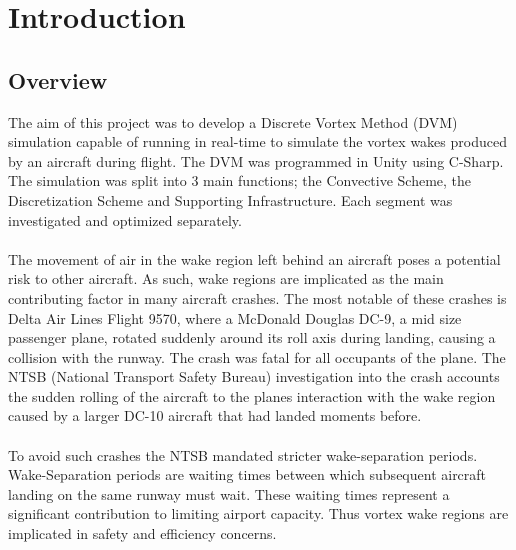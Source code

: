 \section{Introduction}
\subsection{Overview}
The aim of this project was to develop a Discrete Vortex Method (DVM) simulation capable of running in real-time to simulate the vortex wakes produced by an aircraft during flight. The DVM was programmed in Unity using C-Sharp. The simulation was split into 3 main functions; the Convective Scheme, the Discretization Scheme and Supporting Infrastructure. Each segment was investigated and optimized separately.
\\\\
The movement of air in the wake region left behind an aircraft poses a potential risk to other aircraft. As such, wake regions are implicated as the main contributing factor in many aircraft crashes. The most notable of these crashes is Delta Air Lines Flight 9570, where a McDonald Douglas DC-9, a mid size passenger plane, rotated suddenly around its roll axis during landing, causing a collision with the runway. The crash was fatal for all occupants of the plane. The NTSB (National Transport Safety Bureau) investigation into the crash accounts the sudden rolling of the aircraft to the planes interaction with the wake region caused by a larger DC-10 aircraft that had landed moments before.
\\\\
To avoid such crashes the NTSB mandated stricter wake-separation periods. Wake-Separation periods are waiting times between which subsequent aircraft landing on the same runway must wait. These waiting times represent a significant contribution to limiting airport capacity. Thus vortex wake regions are implicated in safety and efficiency concerns.

